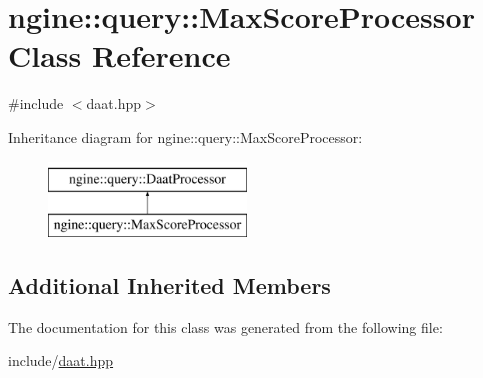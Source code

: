 \hypertarget{classngine_1_1query_1_1MaxScoreProcessor}{}\section{ngine\+:\+:query\+:\+:Max\+Score\+Processor Class Reference}
\label{classngine_1_1query_1_1MaxScoreProcessor}


{\ttfamily \#include $<$daat.\+hpp$>$}

Inheritance diagram for ngine\+:\+:query\+:\+:Max\+Score\+Processor\+:\begin{figure}[H]
\begin{center}
\leavevmode
\includegraphics[height=2.000000cm]{classngine_1_1query_1_1MaxScoreProcessor}
\end{center}
\end{figure}
\subsection*{Additional Inherited Members}


The documentation for this class was generated from the following file\+:\begin{DoxyCompactItemize}
\item 
include/\hyperlink{daat_8hpp}{daat.\+hpp}\end{DoxyCompactItemize}
